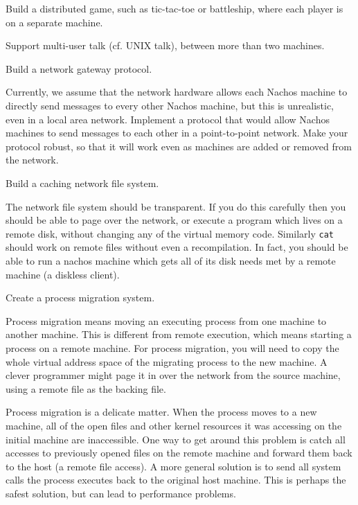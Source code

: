 \begin{description}
\begin{description}

\item Build a distributed game, such as tic-tac-toe or battleship,
where each player is on a separate machine.

\item Support multi-user talk (cf. UNIX talk), between more than two machines.

\item Build a network gateway protocol.  

Currently, we assume that 
the network hardware allows each Nachos machine to directly send messages to
every other Nachos machine, but this is unrealistic, even in a local 
area network.  Implement a protocol that would allow Nachos 
machines to send messages to each other in a point-to-point network.
Make your protocol robust, so that it will work even as machines 
are added or removed from the network.

\item Build a caching network file system.

The network file system should be transparent.  If you do this carefully
then you should be able to page over the network, or execute a program
which lives on a remote disk, without changing any of the virtual
memory code.  Similarly {\tt cat} should work on remote files without
even a recompilation.  In fact, you should be able to run a nachos machine
which gets all of its disk needs met by a remote machine (a diskless
client).

\item Create a process migration system.

Process migration means moving an executing process from one machine
to another machine.  This is different from remote execution, which means
starting a process on a remote machine.  For process migration, you will
need to copy the whole virtual address space of the migrating process
to the new machine.  A clever programmer might page it in over
the network from the source machine, using a remote file as the
backing file.

Process migration is a delicate matter.  When the process moves to a
new machine, all of the open files and other kernel resources it
was accessing on the initial machine are inaccessible.  One way to
get around this problem is catch all accesses to previously opened
files on the remote machine and forward them back to the host (a remote
file access).  A more general solution is to send all system calls the
process executes back to the original host machine.  This is perhaps the
safest solution, but can lead to performance problems.

\end{description}
\end{description}


